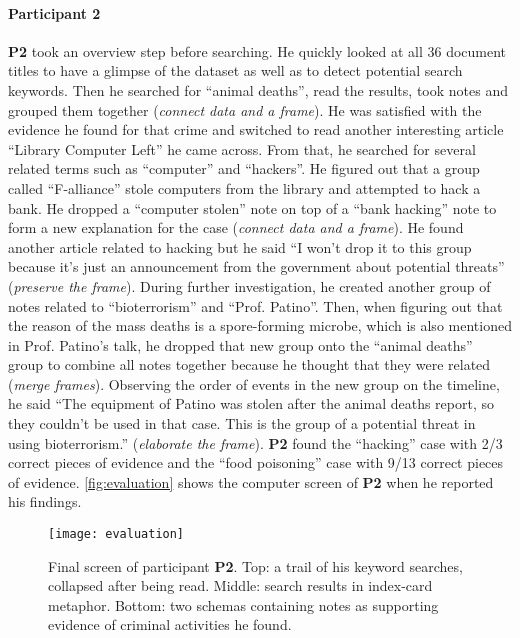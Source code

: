 \paragraph{Participant 2}
\textbf{P2} took an overview step before searching. He quickly looked at all 36 document titles to have a glimpse of the dataset as well as to detect potential search keywords. Then he searched for ``animal deaths'', read the results, took notes and grouped them together (\emph{connect data and a frame}). He was satisfied with the evidence he found for that crime and switched to read another interesting article ``Library Computer Left'' he came across. From that, he searched for several related terms such as ``computer'' and ``hackers''. He figured out that a group called ``F-alliance'' stole computers from the library and attempted to hack a bank. He dropped a ``computer stolen'' note on top of a ``bank hacking'' note to form a new explanation for the case (\emph{connect data and a frame}). He found another article related to hacking but he said ``I won't drop it to this group because it's just an announcement from the government about potential threats'' (\emph{preserve the frame}). During further investigation, he created another group of notes related to ``bioterrorism'' and ``Prof. Patino''. Then, when figuring out that the reason of the mass deaths is a spore-forming microbe, which is also mentioned in Prof. Patino's talk, he dropped that new group onto the ``animal deaths'' group to combine all notes together because he thought that they were related (\emph{merge frames}). Observing the order of events in the new group on the timeline, he said ``The equipment of Patino was stolen after the animal deaths report, so they couldn't be used in that case. This is the group of a potential threat in using bioterrorism.'' (\emph{elaborate the frame}). \textbf{P2} found the ``hacking'' case with 2/3 correct pieces of evidence and the ``food poisoning'' case with 9/13 correct pieces of evidence. \autoref{fig:evaluation} shows the computer screen of \textbf{P2} when he reported his findings.

\begin{figure}
	\centering
	\texttt{[image: evaluation]}
	\caption[Final screen of participant \textbf{P2}]{Final screen of participant \textbf{P2}. Top: a trail of his keyword searches, collapsed after being read. Middle: search results in index-card metaphor. Bottom: two schemas containing notes as supporting evidence of criminal activities he found.}
	\label{fig:evaluation}
\end{figure}

